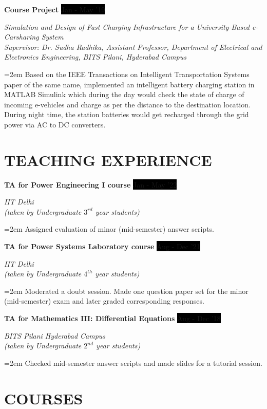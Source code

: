 \documentclass[paper=a4,fontsize=11pt]{scrartcl} %
\newcommand{\sepspace}{\vspace*{1em}}		%
\newcommand{\NewPart}[1]{\section*{\uppercase{#1}}}
\newcommand{\EducationEntry}[4]{
		\noindent \textbf{#1} \hfill      %
		\colorbox{Black}{%
			\parbox{10em}{%
			\hfill\color{White}#2}} \par  %
		\noindent \textit{#3} \par        %
		\noindent\hangindent=2em\hangafter=0 \small #4 %
		\normalsize \par}
\newcommand{\WorkEntry}[4]{				  %
		\noindent \textbf{#1} \hfill      %
		\colorbox{Black}{\color{White}#2} \par  %
		\noindent \textit{#3} \par              %
		\noindent\hangindent=2em\hangafter=0 \small #4 %
		\normalsize \par}
\begin{document}
\sepspace 

\WorkEntry{Course Project}{Jan - May '19}{Simulation and Design of Fast Charging Infrastructure for a University-Based e-Carsharing System\\ Supervisor: Dr. Sudha Radhika, Assistant Professor, Department of Electrical and Electronics Engineering, BITS Pilani, Hyderabad Campus}{Based on the IEEE Transactions on Intelligent Transportation Systems paper of the same name, implemented an intelligent battery charging station in MATLAB Simulink which during the day would check the state of charge of incoming e-vehicles and charge as per the distance to the destination location. During night time, the station batteries would get recharged through the grid power via AC to DC converters.}

\NewPart{Teaching Experience}{}

\WorkEntry{TA for Power Engineering I course}{Jan - May '22}{IIT Delhi\\ (taken by Undergraduate $3^{rd}$ year students)}{Assigned evaluation of minor (mid-semester) answer scripts.}
\sepspace

\WorkEntry{TA for Power Systems Laboratory course}{Aug - Dec '21}{IIT Delhi\\ (taken by Undergraduate $4^{th}$ year students)}{Moderated a doubt session. Made one question paper set for the minor (mid-semester) exam and later graded corresponding responses.}
\sepspace
\sepspace
\WorkEntry{TA for Mathematics III: Differential Equations}{Aug - Dec '18}{BITS Pilani Hyderabad Campus\\ (taken by Undergraduate $2^{nd}$ year students)}{Checked mid-semester answer scripts and made slides for a tutorial session.}

\NewPart{Courses}{}
\end{document}
